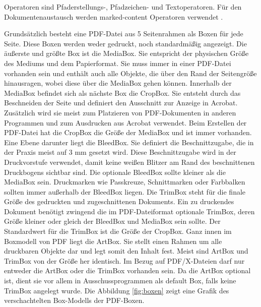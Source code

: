 Operatoren sind Pfaderstellungs-, Pfadzeichen- und Textoperatoren. Für den Dokumentenaustausch werden marked-content Operatoren verwendet \cite{fileformat}. 
\par
Grundsätzlich besteht eine PDF-Datei aus 5 Seitenrahmen als Boxen für jede Seite. Diese Boxen werden weder gedruckt, noch standardmäßig angezeigt. Die äußerste und größte Box ist die MediaBox. Sie entspricht der physischen Größe des Mediums und dem Papierformat. Sie muss immer in einer PDF-Datei vorhanden sein und enthält auch alle Objekte, die über den Rand der Seitengröße hinausragen, wobei diese über die MediaBox gehen können. Innerhalb der MediaBox befindet sich als nächste Box die CropBox. Sie entsteht durch das Beschneiden der Seite und definiert den Ausschnitt zur Anzeige in Acrobat. Zusätzlich wird sie meist zum Platzieren von PDF-Dokumenten in anderen Programmen und zum Ausdrucken aus Acrobat verwendet. Beim Erstellen der PDF-Datei hat die CropBox die Größe der MediaBox und ist immer vorhanden. Eine Ebene darunter liegt die BleedBox. Sie definiert die Beschnittzugabe, die in der Praxis meist auf 3 mm gesetzt wird. Diese Beschnittzugabe wird in der Druckvorstufe verwendet, damit keine weißen Blitzer am Rand des beschnittenen Druckbogens sichtbar sind. Die optionale BleedBox sollte kleiner als die MediaBox sein. Druckmarken wie Passkreuze, Schnittmarken oder Farbbalken sollten immer außerhalb der BleedBox liegen. Die TrimBox steht für die finale Größe des gedruckten und zugeschnittenen Dokuments. Ein zu druckendes Dokument benötigt zwingend die im PDF-Dateiformat optionale TrimBox, deren Größe kleiner oder gleich der BleedBox und MediaBox sein sollte. Der Standardwert für die TrimBox ist die Größe der CropBox. Ganz innen im Boxmodell von PDF liegt die ArtBox. Sie stellt einen Rahmen um alle druckbaren Objekte dar und legt somit den Inhalt fest. Meist sind ArtBox und TrimBox von der Größe her identisch. Im Bezug auf PDF/X-Dateien darf nur entweder die ArtBox oder die TrimBox vorhanden sein. Da die ArtBox optional ist, dient sie vor allem in Ausschussprogrammen als default Box, falls keine TrimBox angelegt wurde. Die Abbildung \ref{fig:boxen} zeigt eine Grafik des verschachtelten Box-Modells der PDF-Boxen.

